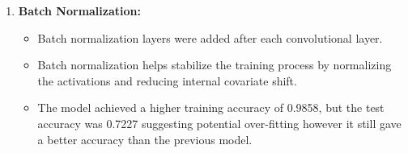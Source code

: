 \documentclass{article}
\begin{document}
\begin{enumerate}
\begin{itemize}
    \end{itemize}
    
   
    
    \item \textbf{Batch Normalization:}
    \begin{itemize}
        \item Batch normalization layers were added after each convolutional layer.
        \item Batch normalization helps stabilize the training process by normalizing the activations and reducing internal covariate shift.
        \item The model achieved a higher training accuracy of 0.9858, but the test accuracy was 0.7227 suggesting potential over-fitting however it still gave a better accuracy than the previous model.
        
    \end{itemize}
    

\end{enumerate}
\end{document}
